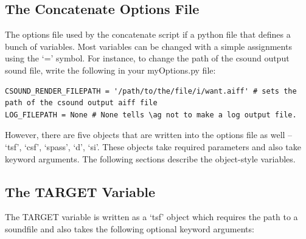 \documentclass{article}
\newcommand{\ag}{audioguide1.1 }
\begin{document}
\begin{spacing}{1.2}
%
%
%
%

\section{The Concatenate Options File}
The options file used by the concatenate script if a python file that defines a bunch of variables.  Most variables can be changed with a simple assignments using the `=' symbol.  For instance, to change the path of the csound output sound file, write the following in your myOptions.py file:
\begin{lstlisting}
CSOUND_RENDER_FILEPATH = '/path/to/the/file/i/want.aiff' # sets the path of the csound output aiff file
LOG_FILEPATH = None # None tells \ag not to make a log output file.
\end{lstlisting}


However, there are five objects that are written into the options file as well -- `tsf', `csf', `spass', `d', `si'.  These objects take required parameters and also take keyword arguments.  The following sections describe the object-style variables.

\subsection{The TARGET Variable}\label{target}
The TARGET variable is written as a `tsf' object which requires the path to a soundfile and also takes the following optional keyword arguments:


\end{spacing}
\end{document}
